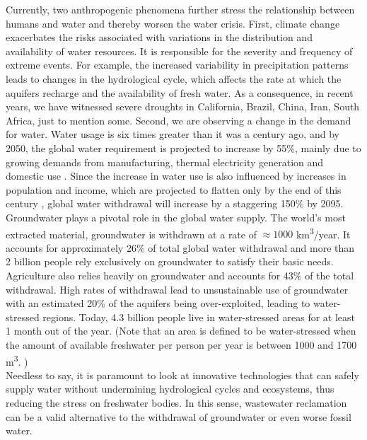 Currently, two anthropogenic phenomena further stress the relationship between humans and water and thereby worsen the water crisis. First, climate change exacerbates the risks associated with variations in the distribution and availability of water resources. It is responsible for the severity and frequency of extreme events. For example, the increased variability in precipitation patterns leads to changes in the hydrological cycle, which affects the rate at which the aquifers recharge and the availability of fresh water. As a consequence, in recent years, we have witnessed severe droughts in California, Brazil, China, Iran, South Africa, just to mention some. \cite{van2016drought} Second, we are observing a change in the demand for water. Water usage is six times greater than it was a century ago, and by 2050, the global water requirement is projected to increase by 55\%, mainly due to growing demands from manufacturing, thermal electricity generation and domestic use \cite{UN2015}. Since the increase in water use is also influenced by increases in population and income, which are projected to flatten only by the end of this century \cite{Gerland234}, global water withdrawal will increase by a staggering 150\% by 2095. \cite{DAVIES2013296}
Groundwater plays a pivotal role in the global water supply. The world's most extracted material, groundwater is withdrawn at a rate of $\approx1000$ km\textsuperscript{3}/year. It accounts for approximately 26\% of total global water withdrawal \cite{Unesco} and more than 2 billion people rely exclusively on groundwater to satisfy their basic needs.\cite{doi:10.1002/9781118971772.ch7} Agriculture also relies heavily on groundwater and accounts for 43\% of the total withdrawal. High rates of withdrawal lead to unsustainable use of groundwater with an estimated 20\% of the aquifers being over-exploited, leading to water-stressed regions.\cite{UN2015} Today, 4.3 billion people live in water-stressed areas for at least 1 month out of the year. (Note that an area is defined to be water-stressed when the amount of available freshwater per person per year is between 1000 and 1700 m\textsuperscript{3}. \cite{mekonnen2016four})\\
Needless to say, it is paramount to look at innovative technologies that can safely supply water without undermining hydrological cycles and ecosystems, thus reducing the stress on freshwater bodies. In this sense, wastewater reclamation can be a valid alternative to the withdrawal of groundwater or even worse fossil water.
 
